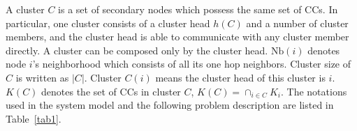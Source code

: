 \documentclass[10pt,journal,compsoc]{IEEEtran}
\theoremstyle{mytheoremstyle}
\theoremstyle{mytheoremstyle}
\theoremstyle{mytheoremstyle}
\begin{document}
A cluster $C$ is a set of secondary nodes which possess the same set of CCs.
In particular, one cluster consists of a cluster head $h(C)$ and a number of cluster members, and the cluster head is able to communicate with any cluster member directly.
A cluster can be composed only by the cluster head.
$\text{Nb}(i)$ denotes node $i$'s neighborhood which consists of all its one hop neighbors.
Cluster size of $C$ is written as $|C|$.
Cluster $C(i)$ means the cluster head of this cluster is $i$.
$K(C)$ denotes the set of CCs in cluster $C$, $ K(C) = \cap_{i\in C} K_i$.
The notations used in the system model and the following problem description are listed in Table~\ref{tab1}.
\end{document}
